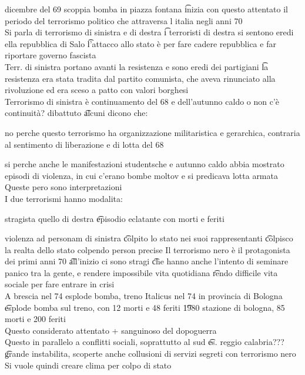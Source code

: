 \documentclass[12pt]{article}
\begin{document}
 dicembre del 69 scoppia bomba in piazza fontana \t inizia con questo attentato il periodo del terrorismo politico che attraversa l italia negli anni 70 \\
Si parla di terrorismo di sinistra e di destra \t i terroristi di destra si sentono eredi ella repubblica di Salo \t l'attacco allo stato è per fare cadere repubblica e far riportare governo fascista \\
Terr. di sinistra portano avanti la resistenza e sono eredi dei partigiani \t la resistenza era stata tradita dal partito comunista, che aveva rinunciato alla rivoluzione ed era sceso a patto con valori borghesi \\
Terrorismo di sinistra è continuamento del 68 e dell'autunno caldo o non c'è continuità? dibattuto \t alcuni dicono che:
\bi
  \item no perche questo terrorismo ha organizzazione militaristica e gerarchica, contraria al sentimento di liberazione e di lotta del 68
  \item si perche anche le manifestazioni studentsche e autunno caldo abbia mostrato episodi di violenza, in cui c'erano bombe moltov e si predicava lotta armata
\ei
Queste pero sono interpretazioni \\
I due terrorismi hanno modalita:
\bi
\item stragista quello di destra \t episodio eclatante con morti e feriti
\item violenza ad personam di sinistra \t colpito lo stato nei suoi rappresentanti \t colpisco la realta dello stato colpendo person precise
\ei
Il terrorismo nero è il protagonista dei primi anni 70 \t all'inizio ci sono stragi \t che hanno anche l'intento di seminare panico tra la gente, e rendere impossibile vita quotidiana \t rendo difficile vita sociale per fare entrare in crisi \\
A brescia nel 74 esplode bomba, treno Italicus nel 74 in provincia di Bologna \t esplode bomba sul treno, con 12 morti e 48 feriti \t 1980 stazione di bologna, 85 morti e 200 feriti \\
Questo considerato attentato + sanguinoso del dopoguerra \\
Questo in parallelo a conflitti sociali, soprattutto al sud \t es. reggio calabria??? \t grande instabilita, scoperte anche collusioni di servizi segreti con terrorismo nero \\
Si vuole quindi creare clima per colpo di stato 
\end{document}
